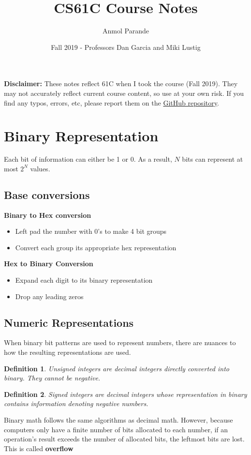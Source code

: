 \documentclass{article}
\newtheorem{definition}{Definition}
\begin{document}
\title{CS61C Course Notes}
\author{Anmol Parande}
\date{Fall 2019 - Professors Dan Garcia and Miki Lustig}
\maketitle
\tableofcontents
\newpage
\textbf{Disclaimer: }These notes reflect 61C when I took the course (Fall 2019). They may not accurately reflect current course content, so use at your own risk.
If you find any typos, errors, etc, please report them on the \href{https://github.com/parandea17/BerkeleyNotes}{GitHub repository}.
\section{Binary Representation}
Each bit of information can either be 1 or 0. As a result, $N$ bits can represent at most $2^N$ values.
\subsection{Base conversions}
\textbf{Binary to Hex conversion}
\begin{itemize}
    \item Left pad the number with 0's to make 4 bit groups
    \item Convert each group its appropriate hex representation
\end{itemize}
\textbf{Hex to Binary Conversion}
\begin{itemize}
    \item Expand each digit to its binary representation
    \item Drop any leading zeros
\end{itemize}
\subsection{Numeric Representations}
When binary bit patterns are used to represent numbers, there are nuances to how the resulting representations are used.
\begin{definition}
    Unsigned integers are decimal integers directly converted into binary. They cannot be negative.
\end{definition}
\begin{definition}
    Signed integers are decimal integers whose representation in binary contains information denoting negative numbers.
\end{definition}
Binary math follows the same algorithms as decimal math. However, because computers only have a finite number of bits
allocated to each number, if an operation's result exceeds the number of allocated bits, the leftmost bits are lost.
This is called \textbf{overflow}
\end{document}
